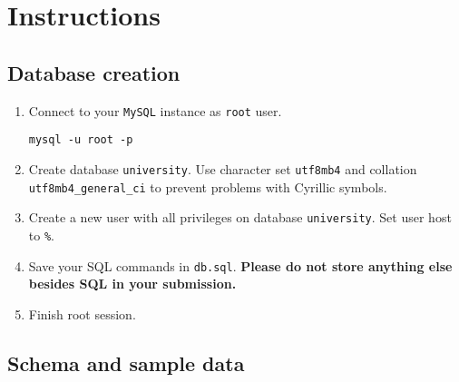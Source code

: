 \documentclass[12pt]{article}
\newcommand{\code}[1]{\texttt{#1}}
\begin{document}
\section*{Instructions}
\subsection*{Database creation}

\begin{enumerate}
\item Connect to your \code{MySQL} instance as \code{root} user.
\begin{verbatim}
mysql -u root -p
\end{verbatim}
\item Create database \code{university}. Use character set \code{utf8mb4} and collation \code{utf8mb4\_general\_ci} to prevent problems with Cyrillic symbols.
\item Create a new user with all privileges on database \code{university}. Set user host to \code{\%}.
\item Save your SQL commands in \code{db.sql}. \textbf{Please do not store anything else besides SQL in your submission.}
\item Finish root session.
\end{enumerate}

\subsection*{Schema and sample data}
\end{document}
